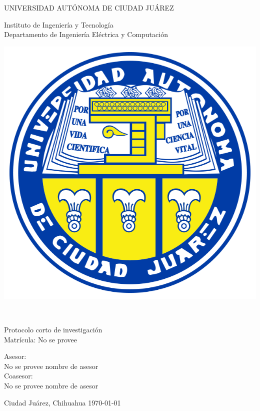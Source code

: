 	\thispagestyle{empty}
\begin{center} \vfill
{\Large UNIVERSIDAD AUTÓNOMA DE CIUDAD JUÁREZ}\\
\vspace{6mm}
{\large Instituto de Ingeniería y Tecnología\\
\vspace{6mm}
Departamento de Ingeniería Eléctrica y Computación
\vspace{20mm}

\includegraphics [scale=0.7]{images/escudo-uacj.png} 
\vspace{10mm}

\thetitle\\
\vspace{15mm}


Protocolo corto de investigación\\
\vspace{5mm}
\theauthor\hspace{10mm} Matrícula: No se provee\\
\vspace{15mm}

Asesor:\\
No se provee nombre de asesor
\\
\vspace{5mm}
Coasesor:\\
No se provee nombre de asesor
\\
} \vfill
	Ciudad Juárez, Chihuahua \hspace{30mm}\today


\end{center} 

